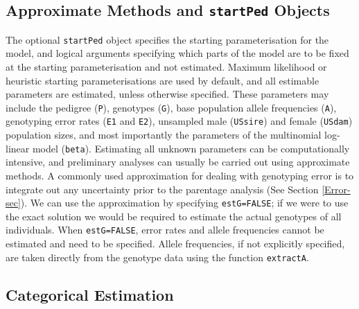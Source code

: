 \documentclass{article}
\begin{document}
\subsection{Approximate Methods and \texttt{startPed} Objects}
\label{approx-sec}

The optional \texttt{startPed} object specifies the starting parameterisation for the model, and logical arguments specifying which parts of the model are to be fixed at the starting parameterisation and not estimated. Maximum likelihood or heuristic starting parameterisations are used by default, and all estimable parameters are estimated, unless otherwise specified. These parameters may include the pedigree (\texttt{P}), genotypes (\texttt{G}), base population allele frequencies (\texttt{A}), genotyping error rates (\texttt {E1} and \texttt {E2}), unsampled male (\texttt{USsire}) and female (\texttt{USdam}) population sizes, and most importantly the parameters of the multinomial log-linear model (\texttt{beta}). Estimating all unknown parameters can be computationally intensive, and preliminary analyses can usually be carried out using approximate methods.  A commonly used approximation for dealing with genotyping error is to integrate out any uncertainty prior to the parentage analysis (See Section \ref{Error-sec}).  We can use the approximation by specifying \texttt{estG=FALSE}; if we were to use the exact solution we would be required to estimate the actual genotypes of all individuals.  When \texttt{estG=FALSE}, error rates and allele frequencies cannot be estimated and need to be specified. Allele frequencies, if not explicitly specified, are taken directly from the genotype data using the function \texttt{extractA}.  

\subsection{Categorical Estimation}
\label{cat-sec}
\end{document}
